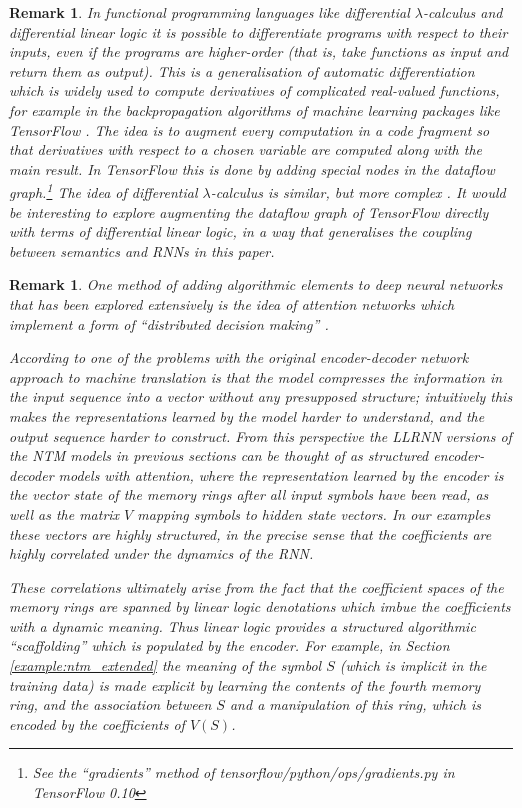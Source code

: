 \documentclass[english,letter paper,12pt,leqno]{article}
\theoremstyle{example}
\newtheorem{remark}[theorem]{Remark}
\numberwithin{equation}{section}
\begin{document}
\begin{remark} In functional programming languages like differential $\lambda$-calculus \cite{difflambda} and differential linear logic \cite{ehrhard-survey} it is possible to differentiate programs with respect to their inputs, even if the programs are higher-order (that is, take functions as input and return them as output). This is a generalisation of automatic differentiation \cite{griewank} which is widely used to compute derivatives of complicated real-valued functions, for example in the backpropagation algorithms of machine learning packages like TensorFlow \cite[\S 4.1]{tensorflow}. The idea is to augment every computation in a code fragment so that derivatives with respect to a chosen variable are computed along with the main result. In TensorFlow this is done by adding special nodes in the dataflow graph.\footnote{See the ``gradients'' method of tensorflow/python/ops/gradients.py in TensorFlow 0.10} The idea of differential $\lambda$-calculus is similar, but more complex \cite{manzyuk}. It would be interesting to explore augmenting the dataflow graph of TensorFlow directly with terms of differential linear logic, in a way that generalises the coupling between semantics and RNNs in this paper.
\end{remark}

\begin{remark} One method of adding algorithmic elements to deep neural networks that has been explored extensively is the idea of \emph{attention networks} which implement a form of ``distributed decision making'' \cite[p.1]{cho}.

According to \cite[\S III.A]{cho} one of the problems with the original encoder-decoder network approach to machine translation \cite{sutskever2} is that the model compresses the information in the input sequence into a vector without any presupposed structure; intuitively this makes the representations learned by the model harder to understand, and the output sequence harder to construct. From this perspective the LLRNN versions of the NTM models in previous sections can be thought of as structured encoder-decoder models with attention, where the representation learned by the encoder is the vector state of the memory rings after all input symbols have been read, as well as the matrix $V$ mapping symbols to hidden state vectors. In our examples these vectors are highly structured, in the precise sense that the coefficients are highly correlated under the dynamics of the RNN.

These correlations ultimately arise from the fact that the coefficient spaces of the memory rings are spanned by linear logic denotations which imbue the coefficients with a dynamic meaning. Thus linear logic provides a structured algorithmic ``scaffolding'' which is populated by the encoder. For example, in Section \ref{example:ntm_extended} the meaning of the symbol $S$ (which is implicit in the training data) is made explicit by learning the contents of the fourth memory ring, and the association between $S$ and a manipulation of this ring, which is encoded by the coefficients of $V(S)$.
\end{remark}
\end{document}
